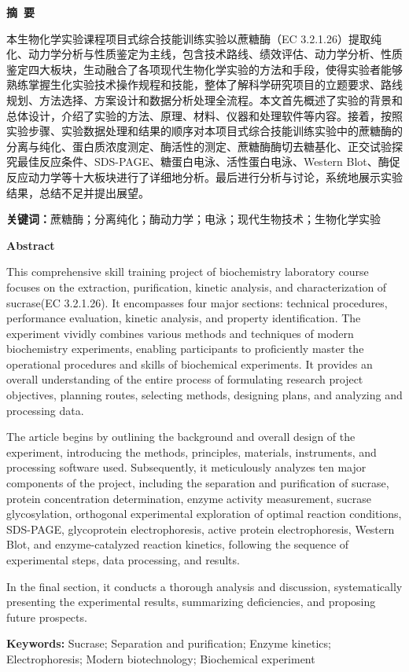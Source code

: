 \clearpage{}
\begin{center}
    \bfseries {} 摘~要
\end{center}

本生物化学实验课程项目式综合技能训练实验以蔗糖酶（EC 3.2.1.26）提取纯化、动力学分析与性质鉴定为主线，包含技术路线、绩效评估、动力学分析、性质鉴定四大板块，生动融合了各项现代生物化学实验的方法和手段，使得实验者能够熟练掌握生化实验技术操作规程和技能，整体了解科学研究项目的立题要求、路线规划、方法选择、方案设计和数据分析处理全流程。本文首先概述了实验的背景和总体设计，介绍了实验的方法、原理、材料、仪器和处理软件等内容。接着，按照实验步骤、实验数据处理和结果的顺序对本项目式综合技能训练实验中的蔗糖酶的分离与纯化、蛋白质浓度测定、酶活性的测定、蔗糖酶酶切去糖基化、正交试验探究最佳反应条件、SDS-PAGE、糖蛋白电泳、活性蛋白电泳、Western Blot、酶促反应动力学等十大板块进行了详细地分析。最后进行分析与讨论，系统地展示实验结果，总结不足并提出展望。

\vspace*{3em}

\textbf{关键词：}蔗糖酶；分离纯化；酶动力学；电泳；现代生物技术；生物化学实验
\clearpage{}
\begin{center}
    \bfseries {} Abstract
\end{center}

This comprehensive skill training project of biochemistry laboratory course focuses on the extraction, purification, kinetic analysis, and characterization of sucrase(EC 3.2.1.26). It encompasses four major sections: technical procedures, performance evaluation, kinetic analysis, and property identification. The experiment vividly combines various methods and techniques of modern biochemistry experiments, enabling participants to proficiently master the operational procedures and skills of biochemical experiments. It provides an overall understanding of the entire process of formulating research project objectives, planning routes, selecting methods, designing plans, and analyzing and processing data.

The article begins by outlining the background and overall design of the experiment, introducing the methods, principles, materials, instruments, and processing software used. Subsequently, it meticulously analyzes ten major components of the project, including the separation and purification of sucrase, protein concentration determination, enzyme activity measurement, sucrase glycosylation, orthogonal experimental exploration of optimal reaction conditions, SDS-PAGE, glycoprotein electrophoresis, active protein electrophoresis, Western Blot, and enzyme-catalyzed reaction kinetics, following the sequence of experimental steps, data processing, and results.

In the final section, it conducts a thorough analysis and discussion, systematically presenting the experimental results, summarizing deficiencies, and proposing future prospects.

\vspace*{3em}

\textbf{Keywords:} Sucrase; Separation and purification; Enzyme kinetics; Electrophoresis; Modern biotechnology; Biochemical experiment
